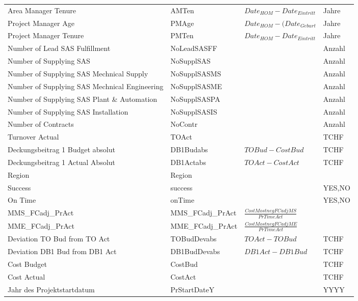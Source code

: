 \begin{landscape}
\begin{center}
\begin{longtable}{p{6cm}|p{4cm}|p{6cm}|p{3cm}}
			Area Manager Tenure & AMTen & $Date_{HOM}-Date_{Eintritt}$ & \multicolumn{1}{l}{Jahre} \\
			Project Manager Age & PMAge & $Date_{HOM}-(Date_{Geburt}$ & \multicolumn{1}{l}{Jahre} \\
			Project Manager Tenure & PMTen & $Date_{HOM}-Date_{Eintritt}$ & \multicolumn{1}{l}{Jahre} \\
			Number of Lead SAS Fulfillment & NoLeadSASFF &       & \multicolumn{1}{l}{Anzahl} \\
			Number of Supplying SAS & NoSupplSAS &       & \multicolumn{1}{l}{Anzahl} \\
			Number of Supplying SAS Mechnical Supply & NoSupplSASMS &       & \multicolumn{1}{l}{Anzahl} \\
			Number of Supplying SAS Mechnical Engineering & NoSupplSASME &       & \multicolumn{1}{l}{Anzahl} \\
			Number of Supplying SAS Plant \& Automation & NoSupplSASPA &       & \multicolumn{1}{l}{Anzahl} \\
			Number of Supplying SAS Installation & NoSupplSASIS &       & \multicolumn{1}{l}{Anzahl} \\
			Number of Contracts & NoContr &       & \multicolumn{1}{l}{Anzahl} \\
			Turnover Actual & TOAct &       & \multicolumn{1}{l}{TCHF} \\
			Deckungsbeitrag 1 Budget absolut & DB1Budabs & $TOBud-CostBud$ & \multicolumn{1}{l}{TCHF} \\
			Deckungsbeitrag 1 Actual Absolut & DB1Actabs & $TOAct-CostAct$ & \multicolumn{1}{l}{TCHF} \\
			Region & Region &       &  \\
			Success & success &       & {YES,NO} \\
			On Time & onTime &       & {YES,NO} \\
			MMS\_FCadj\_PrAct & MMS\_FCadj\_PrAct & $\frac{CostMostnegFCadjMS}{PrTimeAct}$ & \\
			MME\_FCadj\_PrAct & MME\_FCadj\_PrAct & $\frac{CostMostnegFCadjME}{PrTimeAct}$ &  \\
			Deviation TO Bud from TO Act & TOBudDevabs & $TOAct-TOBud$ & TCHF \\
			Deviation DB1 Bud from DB1 Act & DB1BudDevabs & $DB1Act-DB1Bud$ & TCHF \\
			Cost Budget & CostBud &       & TCHF \\
			Cost Actual & CostAct &       & TCHF \\
			Jahr des Projektstartdatum & PrStartDateY &       & YYYY \\

\end{longtable}
\end{center}
\end{landscape}
